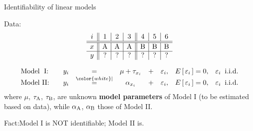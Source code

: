 
\begin{frame}{\LARGE Identifiability of linear models}

\vskip 0.3cm

\pause
Data:{\scriptsize
\begin{equation*}
\begin{array}{c||c|c|c||c|c|c}
i & 1 & 2 & 3 & 4 & 5 & 6 \\
\hline\hline
x & \textnormal{A} & \textnormal{A} & \textnormal{A} &
      \textnormal{B} & \textnormal{B} & \textnormal{B}
\\
\hline
y & ? & ? & ? & ? & ? & ?
\end{array}
\end{equation*}
}

\vskip -0.25cm
\pause
\begin{equation*}
\begin{array}{llcccclc}
\textnormal{Model \;I:} \quad\mbox{}&
	y_{i} &=& \mu + \tau_{x_{i}} &+& \varepsilon_{i}, &
	E\left[\,\varepsilon_{i}\,\right] = 0, &
	\varepsilon_{i} \;\;\textnormal{i.i.d.} \\
\textnormal{Model II:}  \quad\mbox{}&
	y_{i} &\overset{{\color{white}\vert}}{=}& \alpha_{x_{i}} &+& \varepsilon_{i}, &
	E\left[\,\varepsilon_{i}\,\right] = 0, &
	\varepsilon_{i} \;\;\textnormal{i.i.d.}
\end{array}
\end{equation*}
where $\mu$, $\tau_{\textnormal{A}}$, $\tau_{\textnormal{B}}$,
are unknown \textbf{model parameters} of Model I (to be estimated based on data),
while $\alpha_{\textnormal{A}}$, $\alpha_{\textnormal{B}}$ those of Model II.


\vskip 0.8cm
\pause
{\Large\color{customRed}Fact:\quad Model I \;is NOT identifiable; \; Model II \;is.}

\end{frame}
\normalsize


